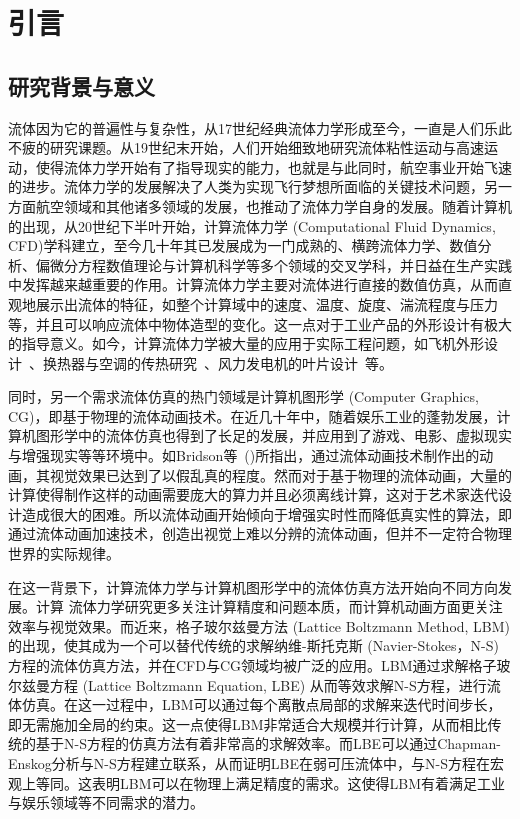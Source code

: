\chapter{引言}

\section{研究背景与意义}
流体因为它的普遍性与复杂性，从17世纪经典流体力学形成至今，一直是人们乐此不疲的研究课题。从19世纪末开始，人们开始细致地研究流体粘性运动与高速运动，使得流体力学开始有了指导现实的能力，也就是与此同时，航空事业开始飞速的进步。流体力学的发展解决了人类为实现飞行梦想所面临的关键技术问题，另一方面航空领域和其他诸多领域的发展，也推动了流体力学自身的发展。随着计算机的出现，从20世纪下半叶开始，计算流体力学 (Computational Fluid Dynamics, CFD)学科建立，至今几十年其已发展成为一门成熟的、横跨流体力学、数值分析、偏微分方程数值理论与计算机科学等多个领域的交叉学科，并日益在生产实践中发挥越来越重要的作用。计算流体力学主要对流体进行直接的数值仿真，从而直观地展示出流体的特征，如整个计算域中的速度、温度、旋度、湍流程度与压力等，并且可以响应流体中物体造型的变化。这一点对于工业产品的外形设计有极大的指导意义。如今，计算流体力学被大量的应用于实际工程问题，如飞机外形设计~\cite{JOHNSON20051115}、换热器与空调的传热研究~\cite{ASLAMBHUTTA20121}、风力发电机的叶片设计~\cite{Shourangiz-Haghighi2020-mo}等。

同时，另一个需求流体仿真的热门领域是计算机图形学 (Computer Graphics, CG)，即基于物理的流体动画技术。在近几十年中，随着娱乐工业的蓬勃发展，计算机图形学中的流体仿真也得到了长足的发展，并应用到了游戏、电影、虚拟现实与增强现实等等环境中。如Bridson等~(\citeyear{doi:10.1126/science.1198769})所指出，通过流体动画技术制作出的动画，其视觉效果已达到了以假乱真的程度。然而对于基于物理的流体动画，大量的计算使得制作这样的动画需要庞大的算力并且必须离线计算，这对于艺术家迭代设计造成很大的困难。所以流体动画开始倾向于增强实时性而降低真实性的算法，即通过流体动画加速技术，创造出视觉上难以分辨的流体动画，但并不一定符合物理世界的实际规律。

在这一背景下，计算流体力学与计算机图形学中的流体仿真方法开始向不同方向发展。计算
流体力学研究更多关注计算精度和问题本质，而计算机动画方面更关注效率与视觉效果。而近来，格子玻尔兹曼方法 (Lattice Boltzmann Method, LBM) 的出现，使其成为一个可以替代传统的求解纳维-斯托克斯 (Navier-Stokes，N-S) 方程的流体仿真方法，并在CFD与CG领域均被广泛的应用。LBM通过求解格子玻尔兹曼方程 (Lattice Boltzmann Equation, LBE) 从而等效求解N-S方程，进行流体仿真。在这一过程中，LBM可以通过每个离散点局部的求解来迭代时间步长，即无需施加全局的约束。这一点使得LBM非常适合大规模并行计算，从而相比传统的基于N-S方程的仿真方法有着非常高的求解效率。而LBE可以通过Chapman-Enskog分析与N-S方程建立联系，从而证明LBE在弱可压流体中，与N-S方程在宏观上等同\cite{Y.H.Qian_1993}。这表明LBM可以在物理上满足精度的需求。这使得LBM有着满足工业与娱乐领域等不同需求的潜力。

